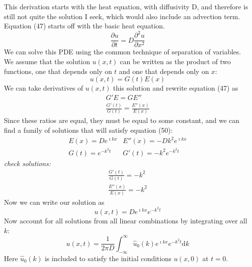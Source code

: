 \documentclass[draft, jgrga]{AGUTeX}
\begin{document}
\begin{article}
This derivation starts with the heat equation, with diffusivity D, and therefore is still not quite the solution I seek, which would also include an advection term. Equation (47) starts off with the basic heat equation.
\begin{equation}
\frac{\partial u}{\partial t}
= D \frac{\partial ^2u}{\partial x^2}
\end{equation}
We can solve this PDE using the common technique of separation of variables. We assume that the solution \begin{math} u(x,t) \end{math} can be written as the product of two functions, one that depends only on \begin{math} t \end{math} and one that depends only on \begin{math} x \end{math}:
\begin{equation}
u(x,t) = G(t)E(x)
\end{equation}
We can take derivatives of $u(x,t)$ this solution and rewrite equation (47) as
\begin{eqnarray}
G'E = GE'' \\
\frac{G'(t)}{G(t)} = \frac{E''(x)}{E(x)}
\end{eqnarray}
Since these ratios are equal, they must be equal to some constant, and we can find a family of solutions that will satisfy equation (50):
\begin{eqnarray}
E(x) = De^{\imath kx} & E''(x) = -Dk^2e^{\imath kx} \\
G(t) = e^{-k^2t} & G'(t) = -k^2 e^{-k^2t} \nonumber
\end{eqnarray}
\textit{check solutions:}
\begin{eqnarray}
\frac{G'(t)}{G(t)} = -k^2  \nonumber \\
\frac{E''(x)}{E(x)} = -k^2  \nonumber
\end{eqnarray}
Now we can write our solution as
\begin{equation}
u(x,t) = De^{\imath kx}e^{-k^2t}
\end{equation}
Now account for all solutions from all linear combinations by integrating over all $k$:
\begin{equation}
u(x,t) = \frac{1}{2 \pi D}
\int^\infty_{-\infty} \hat{u}_0 (k) e^{\imath kx} e^{-k^2t} \mathrm{d}k
\end{equation}
Here \begin{math}  \hat{u}_0 (k) \end{math} is included to satisfy the initial conditions \begin{math} u(x,0) \end{math} at \begin{math} t=0 \end{math}.\\

\end{article}
\end{document}
